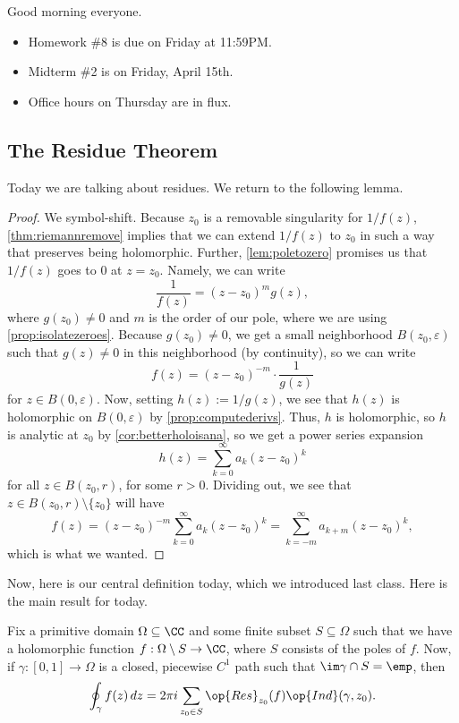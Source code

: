 
Good morning everyone.
\begin{itemize}
	\item Homework \#8 is due on Friday at 11:59PM.
	\item Midterm \#2 is on Friday, April 15th.
	\item Office hours on Thursday are in flux.
\end{itemize}

\subsection{The Residue Theorem}
Today we are talking about residues. We return to the following lemma.
\laurent*
\begin{proof}
	We symbol-shift. Because $z_0$ is a removable singularity for $1/f(z)$, \autoref{thm:riemannremove} implies that we can extend $1/f(z)$ to $z_0$ in such a way that preserves being holomorphic. Further, \autoref{lem:poletozero} promises us that $1/f(z)$ goes to $0$ at $z=z_0$. Namely, we can write
	\[\frac1{f(z)}=(z-z_0)^mg(z),\]
	where $g(z_0)\ne0$ and $m$ is the order of our pole, where we are using \autoref{prop:isolatezeroes}. Because $g(z_0)\ne0$, we get a small neighborhood $B(z_0,\varepsilon)$ such that $g(z)\ne0$ in this neighborhood (by continuity), so we can write
	\[f(z)=(z-z_0)^{-m}\cdot\frac1{g(z)}\]
	for $z\in B(0,\varepsilon)$. Now, setting $h(z):=1/g(z)$, we see that $h(z)$ is holomorphic on $B(0,\varepsilon)$ by \autoref{prop:computederivs}. Thus, $h$ is holomorphic, so $h$ is analytic at $z_0$ by \autoref{cor:betterholoisana}, so we get a power series expansion
	\[h(z)=\sum_{k=0}^\infty a_k(z-z_0)^k\]
	for all $z\in B(z_0,r)$, for some $r>0$. Dividing out, we see that $z\in B(z_0,r)\setminus\{z_0\}$ will have
	\[f(z)=(z-z_0)^{-m}\sum_{k=0}^\infty a_k(z-z_0)^k=\sum_{k=-m}^\infty a_{k+m}(z-z_0)^k,\]
	which is what we wanted.
\end{proof}
Now, here is our central definition today, which we introduced last class.
\resideudef*
\noindent Here is the main result for today.
\begin{theorem} \label{thm:residue}
	Fix a primitive domain $\Omega\subseteq\CC$ and some finite subset $S\subseteq\Omega$ such that we have a holomorphic function $f:\Omega\setminus S\to\CC$, where $S$ consists of the poles of $f$. Now, if $\gamma:[0,1]\to\Omega$ is a closed, piecewise $C^1$ path such that $\im\gamma\cap S=\emp$, then
	\[\oint_\gamma f(z)\,dz=2\pi i\sum_{z_0\in S}\op{Res}_{z_0}(f)\op{Ind}(\gamma,z_0).\]
\end{theorem}
